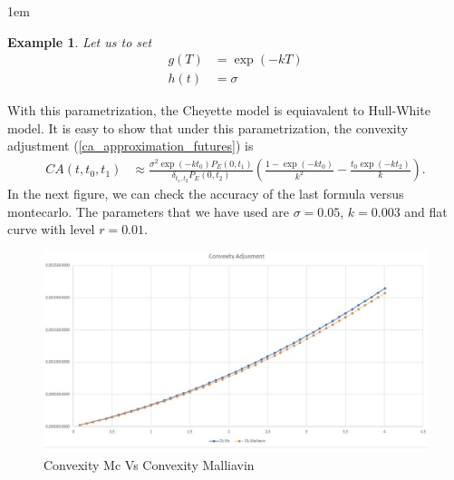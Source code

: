 \documentclass[a4paper,10pt]{article}
\newtheorem{example}[theorem]{Example}
\newcommand{\1}{\mathbf{1}}
\begin{document}
\hspace{1cm}
\fboxsep1em
\begin{example}\label{example_ca_future}
Let us to set 
\begin{align*}
g(T) &= \exp(-kT) \\
h(t) &= \sigma
\end{align*}
\end{example}
With this parametrization, the Cheyette model is equiavalent to Hull-White model. It is easy to show that under this parametrization, the convexity adjustment (\ref{ca_approximation_futures}) is
\begin{align*}
CA(t,t_0,t_1) & \approx \frac{\sigma^{2} \exp(-k t_0)  P_{E}(0,t_1)}{\delta_{t_1,t_2} P_{E}(0,t_2)} \left(\frac{1 - \exp(- k t_0)}{k^{2}} - \frac{t_0 \exp(-k t_2)}{k} \right).   
\end{align*}
In the next figure, we can check the accuracy of the last formula versus montecarlo. The parameters that we have used are $\sigma=0.05$, $k=0.003$ and flat curve with level $r=0.01$.

\begin{figure}[h]
	\begin{center}
		\includegraphics[scale=0.3]{Figures/future_convexity.jpg}
		\caption{Convexity Mc Vs Convexity Malliavin}
	\end{center}
\end{figure} 
\end{document}
